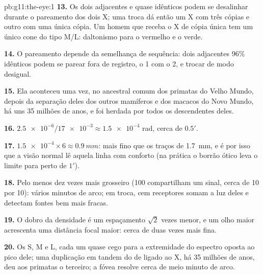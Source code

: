 \begin{solution}{pb:g11:the-eye:1}
\textbf{13.} Os dois  adjacentes e quase idênticos podem se
desalinhar durante o pareamento dos dois  X; uma troca dá
então um X com três cópias e outro com uma única cópia. Um homem que
receba o X de cópia única tem um único cone do tipo M/L: daltonismo
para o vermelho e o verde.

\textbf{14.} O pareamento depende da semelhança de sequência: dois
 adjacentes 96\% idênticos podem se parear fora de registro, o
 1 com o  2, e trocar de modo desigual.

\textbf{15.} Ela aconteceu uma vez, no ancestral comum dos primatas do
Velho Mundo, depois da separação deles dos outros mamíferos e dos
macacos do Novo Mundo, há uns 35 milhões de anos, e foi herdada por
todos os descendentes deles.

\textbf{16.} $\num{2.5e-6}/\num{17e-3} \approx \num{1.5e-4}$ rad, cerca
de $0.5'$.

\textbf{17.} $\num{1.5e-4} \times 6 \approx \qty{0.9}{mm}$: mais fino
que os traços de \qty{1.7}{mm}, e é por isso que a visão normal lê
aquela linha com conforto (na prática o borrão ótico leva o limite
para perto de $1'$).

\textbf{18.} Pelo menos dez vezes mais grosseiro (100 
compartilham um sinal, cerca de 10 por 10): vários minutos de arco; em
troca, cem receptores somam a luz deles e detectam fontes bem mais
fracas.

\textbf{19.} O dobro da densidade é um espaçamento $\sqrt{2}$ vezes
menor, e um olho maior acrescenta uma distância focal maior: cerca de
duas vezes mais fina.

\textbf{20.} Os  S, M e L, cada um quase cego para a extremidade
do espectro oposta ao pico dele; uma duplicação em tandem do  de
 ligado ao X, há 35 milhões de anos, deu aos primatas o terceiro;
a fóvea resolve cerca de meio minuto de arco.
\end{solution}

